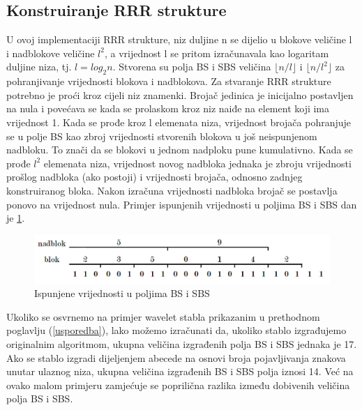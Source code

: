 \subsection{Konstruiranje RRR strukture}
U ovoj implementaciji RRR strukture, niz duljine n se dijelio u blokove veličine l i nadblokove veličine $l^2$, a vrijednost l se pritom izračunavala kao logaritam duljine niza, tj. $l=log_2 n$. Stvorena su polja BS i SBS veličina $\lfloor n/l \rfloor$ i $\lfloor n/l^{2} \rfloor$ za pohranjivanje vrijednosti blokova i nadblokova. Za stvaranje RRR strukture potrebno je proći kroz cijeli niz znamenki. Brojač jedinica je inicijalno postavljen na nula i povećava se kada se prolaskom kroz niz naiđe na element koji ima vrijednost 1. Kada se prođe kroz l elemenata niza, vrijednost brojača pohranjuje se u polje BS kao zbroj vrijednosti stvorenih blokova u još neispunjenom nadbloku. To znači da se blokovi u jednom nadploku pune kumulativno. Kada se prođe $l^2$ elemenata niza, vrijednost novog nadbloka jednaka je zbroju vrijednosti prošlog nadbloka (ako postoji) i vrijednosti brojača, odnosno zadnjeg konstruiranog bloka. Nakon izračuna vrijednosti nadbloka brojač se postavlja ponovo na vrijednost nula. Primjer ispunjenih vrijednosti u poljima BS i SBS dan je \ref{rrr1}.

\begin{figure}[H]
\centering
\includegraphics[width=\linewidth]{./pictures/rrr1.png}
\caption{Ispunjene vrijednosti u poljima BS i SBS}\label{rrr1}
\end{figure}

Ukoliko se osvrnemo na primjer wavelet stabla prikazanim u prethodnom poglavlju (\ref{usporedba}), lako možemo izračunati da, ukoliko stablo izgrađujemo originalnim algoritmom, ukupna veličina izgrađenih polja BS i SBS jednaka je 17. Ako se stablo izgradi dijeljenjem abecede na osnovi broja pojavljivanja znakova unutar ulaznog niza, ukupna veličina izgrađenih BS i SBS polja iznosi 14. Već na ovako malom primjeru zamjećuje se poprilična razlika između dobivenih veličina polja BS i SBS.


